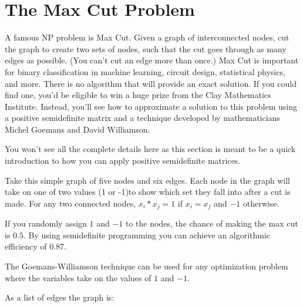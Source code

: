\section{The Max Cut Problem}
A famous NP problem is Max Cut. Given a graph of interconnected nodes, cut the graph to create two sets of nodes, such that the cut goes through as many edges as possible. (You can't cut an edge more than once.) Max Cut is important for binary classification in machine learning, circuit design, statistical physics, and more. There is no algorithm that will provide an exact solution. If you could find one, you'd be eligible to win a huge prize from the Clay Mathematics Institute. Instead, you'll see how to approximate a solution to this  problem using a positive semidefinite matrix and a technique developed by mathematicians Michel Goemans and David Williamson. 

You won't see all the complete details here as this section is meant to be a quick introduction to how you can apply positive semidefinite matrices. 

Take this simple graph of five nodes and six edges. Each node in the graph will take on one of two values (1 or -1)to show which set they fall into after a cut is made. For any two connected nodes, $x_i*x_j = 1$ if $x_i = x_j$ and $-1$ otherwise.

If you randomly assign $1$ and $-1$ to the nodes, the chance of making the max cut is $0.5$. By using semidefinite programming you can achieve an algorithmic efficiency of $0.87$. 

The Goemans-Williamson technique can be used for any optimization problem where the variables take on the values of $1$ and $-1$.


As a list of edges the graph is:


